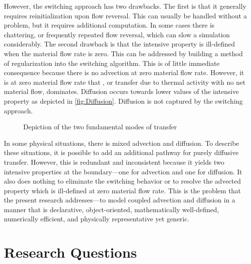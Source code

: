 However, the switching approach has two drawbacks.  The first is that it generally requires reinitialization upon flow reversal.  This can usually be handled without a problem, but it requires additional computation.  In some cases there is chattering, or frequently repeated flow reversal, which can slow a simulation considerably.  The second drawback is that the intensive property is ill-defined when the material flow rate is zero.  This can be addressed by building a method of regularization into the switching algorithm.  This is of little immediate consequence because there is no advection at zero material flow rate.  However, it is at zero material flow rate that \emph{}, or transfer due to thermal activity with no net material flow, dominates.  Diffusion occurs towards lower values of the intensive property as depicted in \autoref{fig:Diffusion}.  Diffusion is not captured by the switching approach.

\begin{figure}[htbp]
  \quad
  \caption[Depiction of advection and diffusion]{Depiction of the two fundamental modes of transfer}%
  \label{fig:AdvectionDiffusion}%
\end{figure}

In some physical situations, there is mixed advection and diffusion.  To describe these situations, it is possible to add an additional pathway for purely diffusive transfer.  However, this is redundant and inconsistent because it yields two intensive properties at the boundary---one for advection and one for diffusion.  It also does nothing to eliminate the switching behavior or to resolve the advected property which is ill-defined at zero material flow rate.  This is the problem that the present research addresses---to model coupled advection and diffusion in a manner that is declarative, object-oriented, mathematically well-defined, numerically efficient, and physically representative yet generic.



\section{Research Questions}
\label{sec:Questions}

